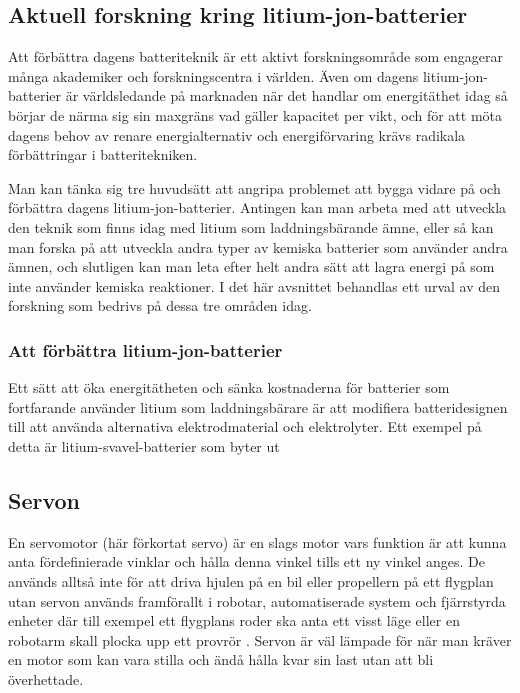 \documentclass[a4paper,12pt]{article}
\begin{document}
\subsection{Aktuell forskning kring litium-jon-batterier}
Att förbättra dagens batteriteknik är ett aktivt forskningsområde som engagerar många akademiker och forskningscentra i världen. Även om dagens litium-jon-batterier är världsledande på marknaden när det handlar om energitäthet idag så börjar de närma sig sin maxgräns vad gäller kapacitet per vikt, och för att möta dagens behov av renare energialternativ och energiförvaring krävs radikala förbättringar i batteritekniken. \cite{better-battery} 

Man kan tänka sig tre huvudsätt att angripa problemet att bygga vidare på och förbättra dagens litium-jon-batterier. Antingen kan man arbeta med att utveckla den teknik som finns idag med litium som laddningsbärande ämne, eller så kan man forska på att utveckla andra typer av kemiska batterier som använder andra ämnen, och slutligen kan man leta efter helt andra sätt att lagra energi på som inte använder kemiska reaktioner. I det här avsnittet behandlas ett urval av den forskning som bedrivs på dessa tre områden idag.

\subsubsection{Att förbättra litium-jon-batterier}
Ett sätt att öka energitätheten och sänka kostnaderna för batterier som fortfarande använder litium som laddningsbärare är att modifiera batteridesignen till att använda alternativa elektrodmaterial och elektrolyter. Ett exempel på detta är litium-svavel-batterier som byter ut 


\subsection{Servon}
 
En servomotor (här förkortat servo) är en slags motor vars funktion är att kunna anta fördefinierade  vinklar och hålla denna vinkel tills ett ny vinkel anges. De används alltså inte för att driva hjulen på en bil eller propellern på ett flygplan utan servon används framförallt i robotar, automatiserade system  och fjärrstyrda enheter där till exempel ett flygplans roder ska anta ett visst läge eller en robotarm skall plocka upp ett provrör . Servon är väl lämpade för när man kräver en motor som kan vara stilla och ändå hålla kvar sin last utan att bli överhettade. 
 
\end{document}
